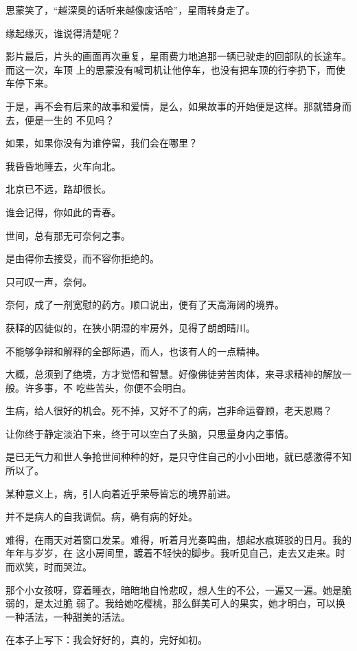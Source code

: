 \documentclass[12pt,a4paper]{article}
\begin{document}
		思蒙笑了，“越深奥的话听来越像废话哈”，星雨转身走了。

		缘起缘灭，谁说得清楚呢？

		影片最后，片头的画面再次重复，星雨费力地追那一辆已驶走的回部队的长途车。而这一次，车顶
	上的思蒙没有喊司机让他停车，也没有把车顶的行李扔下，而使车停下来。

		于是，再不会有后来的故事和爱情，是么，如果故事的开始便是这样。那就错身而去，便是一生的
	不见吗？

		如果，如果你没有为谁停留，我们会在哪里？

		我昏昏地睡去，火车向北。

		北京已不远，路却很长。

		谁会记得，你如此的青春。

	\endwriting



		世间，总有那无可奈何之事。

		是由得你去接受，而不容你拒绝的。

		只可叹一声，奈何。

		奈何，成了一剂宽慰的药方。顺口说出，便有了天高海阔的境界。

		获释的囚徒似的，在狭小阴湿的牢房外，见得了朗朗晴川。

		不能够争辩和解释的全部际遇，而人，也该有人的一点精神。

		大概，总须到了绝境，方才觉悟和智慧。好像佛徒劳苦肉体，来寻求精神的解放一般。许多事，不
	吃些苦头，你便不会明白。

		生病，给人很好的机会。死不掉，又好不了的病，岂非命运眷顾，老天恩赐？

		让你终于静定淡泊下来，终于可以空白了头脑，只思量身内之事情。

		是已无气力和世人争抢世间种种的好，是只守住自己的小小田地，就已感激得不知所以了。

		某种意义上，病，引人向着近乎荣辱皆忘的境界前进。

		并不是病人的自我调侃。病，确有病的好处。

		难得，在雨天对着窗口发呆。难得，听着月光奏鸣曲，想起水痕斑驳的日月。我的年年与岁岁，在
	这小房间里，踱着不轻快的脚步。我听见自己，走去又走来。时而欢笑，时而哭泣。

		那个小女孩呀，穿着睡衣，暗暗地自怜悲叹，想人生的不公，一遍又一遍。她是脆弱的，是太过脆
	弱了。我给她吃樱桃，那么鲜美可人的果实，她才明白，可以换一种活法，一种甜美的活法。

		在本子上写下：我会好好的，真的，完好如初。
\end{document}
